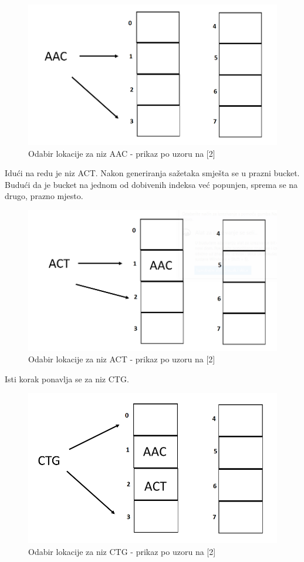\documentclass[times, utf8, seminar, numeric]{fer}
\begin{document}
\begin{figure}[H]
  \centering
  \setlength{\intextsep}{5pt}
  \includegraphics[scale = 0.4]{images/insertion1.png}
  \caption{Odabir lokacije za niz AAC - prikaz po uzoru na [2]}
  \label{fig_insert1}
\end{figure}
Idući na redu je niz ACT. Nakon generiranja sažetaka smješta se u prazni bucket. Budući da je bucket na jednom od dobivenih indeksa već popunjen, sprema se na drugo, prazno mjesto.
\begin{figure}[H]
  \centering
  \setlength{\intextsep}{5pt}
  \includegraphics[scale = 0.4]{images/insertion2.png}
  \caption{Odabir lokacije za niz ACT - prikaz po uzoru na [2]}
  \label{fig_insert2}
\end{figure}

Isti korak ponavlja se za niz CTG.
\begin{figure}[H]
  \centering
  \setlength{\intextsep}{5pt}
  \includegraphics[scale = 0.4]{images/insertion3.png}
  \caption{Odabir lokacije za niz CTG - prikaz po uzoru na [2]}
  \label{fig_insert3}
\end{figure}
\end{document}
